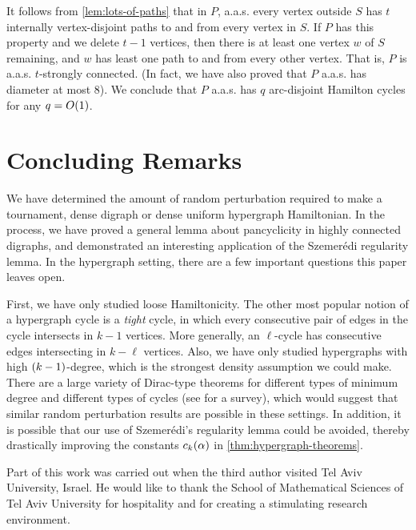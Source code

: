 \documentclass[11pt,english]{article}
\theoremstyle{plain}
\theoremstyle{definition}
\theoremstyle{definition}
\theoremstyle{plain}
\theoremstyle{plain}
\theoremstyle{plain}
\theoremstyle{plain}
\theoremstyle{remark}
\theoremstyle{remark}
\let\originalleft\left
\let\originalright\right
\renewcommand{\left}{\mathopen{}\mathclose\bgroup\originalleft}
\renewcommand{\right}{\aftergroup\egroup\originalright}
\begin{document}
It follows from \ref{lem:lots-of-paths} that in $P$, a.a.s. every vertex
outside $S$ has $t$ internally vertex-disjoint paths to and from every vertex in $S$.
If $P$ has this property and we delete $t-1$ vertices, then there is at least one vertex $w$
of $S$ remaining, and $w$ has least one path to and from every other
vertex. That is, $P$ is a.a.s. $t$-strongly connected. (In fact, we have also
proved that $P$ a.a.s. has diameter at most 8). We conclude that $P$ a.a.s. has $q$ arc-disjoint Hamilton cycles for any $q=O\left(1\right)$.


\section{Concluding Remarks}

We have determined the amount of random perturbation required to make
a tournament, dense digraph or dense uniform hypergraph Hamiltonian. In
the process, we have proved a general lemma about pancyclicity in
highly connected digraphs, and demonstrated an interesting application
of the Szemer\'edi regularity lemma. In the hypergraph setting, there are a few important questions
this paper leaves open.

First, we have only studied loose Hamiltonicity. The other most popular
notion of a hypergraph cycle is a \emph{tight} cycle, in which every
consecutive pair of edges in the cycle intersects in $k-1$ vertices.
More generally, an $\ell$-cycle has consecutive edges intersecting
in $k-\ell$ vertices. Also, we have only studied hypergraphs with
high $\left(k-1\right)$-degree, which is the strongest density assumption
we could make. There are a large variety of Dirac-type theorems for
different types of minimum degree and different types of cycles (see
\cite{RR10} for a survey), which would suggest that similar random
perturbation results are possible in these settings. In addition,
it is possible that our use of Szemer\'edi's regularity lemma could
be avoided, thereby drastically improving the constants $\chyp\left(\alpha\right)$
in \ref{thm:hypergraph-theorems}.

\medskip

 Part of this work was carried out when the third author visited
Tel Aviv University, Israel. He would like to thank the School of Mathematical Sciences of Tel Aviv University for hospitality and for creating a stimulating research environment.
\end{document}
